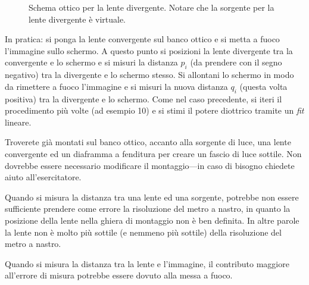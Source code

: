 \documentclass{lab1-article}
\begin{document}
\begin{article}
\begin{figure}[htb!]
\begin{center}
\begin{tikzpicture}[scale=1.25]
  \end{tikzpicture}
  \caption{Schema ottico per la lente divergente.
    Notare che la sorgente per la lente divergente \`e virtuale.}
  \label{fig:divergente}
\end{center}
\end{figure}

In pratica: si ponga la lente convergente sul banco ottico e si metta a fuoco
l'immagine sullo schermo. A questo punto si posizioni la lente divergente
tra la convergente e lo schermo e si misuri la distanza $p_i$ (da prendere con
il segno negativo) tra la divergente e lo schermo stesso. Si allontani lo
schermo in modo da rimettere a fuoco l'immagine e si misuri la nuova distanza
$q_i$ (questa volta positiva) tra la divergente e lo schermo. Come nel caso
precedente, si iteri il procedimento pi\`u volte (ad esempio 10) e si stimi
il potere diottrico tramite un \emph{fit} lineare.


\secconsiderations


Troverete gi\`a montati sul banco ottico, accanto alla sorgente di luce, una
lente convergente ed un diaframma a fenditura per creare un fascio di luce
sottile. Non dovrebbe essere necessario modificare il montaggio---in caso di
bisogno chiedete aiuto all'esercitatore.



Quando si misura la distanza tra una lente ed una sorgente, potrebbe non essere
sufficiente prendere come errore la risoluzione del metro a nastro, in quanto
la posizione della lente nella ghiera di montaggio non \`e ben definita.
In altre parole la lente non \`e molto pi\`u sottile (e nemmeno pi\`u sottile)
della risoluzione del metro a nastro.

Quando si misura la distanza tra la lente e l'immagine, il contributo maggiore
all'errore di misura potrebbe essere dovuto alla messa a fuoco.


\end{article}
\end{document}
